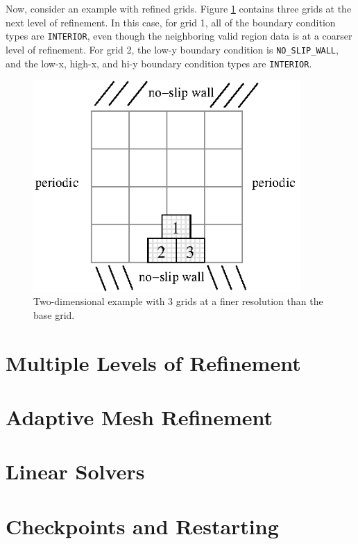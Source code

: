 Now, consider an example with refined grids.  Figure \ref{fig:bc_example3}
contains three grids at the next level of refinement.  In this case, for grid 1,
all of the boundary condition types are {\tt INTERIOR}, even though the neighboring
valid region data is at a coarser level of refinement.  For grid 2, the low-y
boundary condition is {\tt NO\_SLIP\_WALL}, and the low-x, high-x, and hi-y
boundary condition types are {\tt INTERIOR}.
\begin{figure}[tb]
\centering
\includegraphics[width=4in]{./AdvancedTopics/bc_example3}
\caption{\label{fig:bc_example3}Two-dimensional example with 3 grids at a finer
resolution than the base grid.}
\end{figure}

\section{Multiple Levels of Refinement}\label{Sec:Refinement}
\section{Adaptive Mesh Refinement}\label{Sec:AMR}
\section{Linear Solvers}\label{Sec:Linear Solvers}
\section{Checkpoints and Restarting}\label{Sec:Checkpoints}


